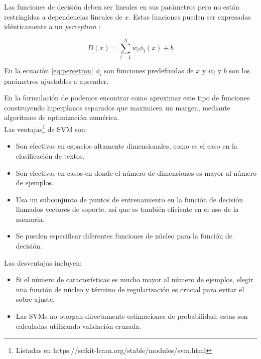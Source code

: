 Las funciones de decisión deben ser lineales en sus parámetros pero no están restringidas a dependencias lineales de $x$. Estas funciones pueden ser expresadas idénticamente a un \textit{perceptron }\citep{block1962analysis}:

\begin{equation} \label{eq:percetron}
    D(x) = \sum_{i=1}^{N} w_i\phi_i(x) + b
\end{equation}

En la ecuación \ref{eq:percetron} $ \phi_i$ son funciones predefinidas de $x$ y $w_i$ y $b$ son los parámetros ajustables a aprender.

En la formulación de \citep{boser1992training, cortes1995support} podemos encontrar como aproximar este tipo de funciones construyendo hiperplanos separados que maximicen un margen, mediante algoritmos de optimización numérica. \\

Las ventajas\footnote{Listadas en https://scikit-learn.org/stable/modules/svm.html} de SVM son: 
\begin{itemize}
    \item Son efectivas en espacios altamente dimensionales, como es el caso en la clasificación de textos.
    \item Son efectivas en casos en donde el número de dimensiones es mayor al número de ejemplos.
    \item Usa un subconjunto de puntos de entrenamiento en la función de decisión llamados vectores de soporte, así que es también eficiente en el uso de la memoria.
    \item Se pueden especificar diferentes funciones de núcleo para la función de decisión. 
\end{itemize}

Las desventajas incluyen:
\begin{itemize}
    \item Si el número de características es mucho mayor al número de ejemplos, elegir una función de núcleo y término de regularización es crucial para evitar el sobre ajuste.
    \item Las SVMs no otorgan directamente estimaciones de probabilidad, estas son calculadas utilizando validación cruzada.
    
\end{itemize}
    
    
    


